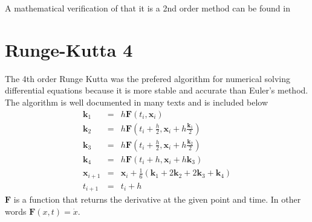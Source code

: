 A mathematical verification of that it is a 2nd order method can be found in
\cite{Otte, NagleSaff}
\section{Runge-Kutta 4}
\label{sec:RungeKutta4}
The 4th order Runge Kutta was the prefered algorithm for numerical solving
differential equations because it is more stable and accurate than Euler's
method. The algorithm is well documented in many texts \cite{Eberly,NagleSaff}
and is included below
\begin{eqnarray*}
    \mathbf{k}_1 &=& h\mathbf{F}(t_i,\mathbf{x}_i) \\
    \mathbf{k}_2 &=& h\mathbf{F}(t_i + \frac{h}{2},\mathbf{x}_i + h\frac{\mathbf{k}_1}{2})\\ 
    \mathbf{k}_3 &=& h\mathbf{F}(t_i + \frac{h}{2},\mathbf{x}_i + h\frac{\mathbf{k}_2}{2}) \\
    \mathbf{k}_4 &=& h\mathbf{F}(t_i + h, \mathbf{x}_i + h\mathbf{k}_3)\\
    \mathbf{x}_{i+1} &=& \mathbf{x}_i + \frac{1}{6}(\mathbf{k}_1 + 2\mathbf{k}_2
        + 2\mathbf{k}_3 + \mathbf{k}_4)\\
    t_{i+1} &=& t_i + h
\end{eqnarray*}
$\mathbf{F}$ is a function that returns the derivative at the given point and
time. In other words $\mathbf{F}(x,t)=\dot{x}$. 

